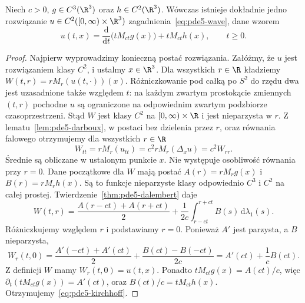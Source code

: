\begin{twierdzenie}
\label{thm:pde5-kirchhoff}
Niech $c>0$, $g\in C^3(\R^3)$ oraz
$h\in C^2(\R^3)$. Wówczas istnieje dokładnie
jedno rozwiązanie $u\in C^2([0,\infty)\times\R^3)$
zagadnienia~\eqref{eq:pde5-wave}, dane wzorem
\begin{equation}\label{eq:pde5-kirchhoff}
 u(t,x)=\frac{\mathrm d}{\mathrm dt}
 \bigl(t M_{ct}g(x)\bigr)+t M_{ct}h(x),\qquad t\geq0.
\end{equation}
\end{twierdzenie}
\begin{proof}
Najpierw wyprowadzimy konieczną postać rozwiązania.
Załóżmy, że $u$ jest rozwiązaniem klasy $C^2$,
i ustalmy $x\in\R^3$. Dla wszystkich $r\in\R$
kładziemy $W(t,r)=rM_r(u(t,\cdot))(x)$.
Różniczkowanie pod całką po $S^2$ do rzędu dwa
jest uzasadnione także względem $t$: na każdym
zwartym prostokącie zmiennych $(t,r)$ pochodne
$u$ są ograniczone na odpowiednim zwartym
podzbiorze czasoprzestrzeni. Stąd $W$ jest klasy
$C^2$ na $[0,\infty)\times\R$ i jest nieparzysta
w $r$. Z lematu~\ref{lem:pde5-darboux}, w postaci
bez dzielenia przez $r$, oraz równania falowego
otrzymujemy dla wszystkich $r\in\R$
\[
 W_{tt}=rM_r(u_{tt})=c^2rM_r(\Delta_xu)=c^2W_{rr}.
\]
Średnie są obliczane w ustalonym punkcie $x$.
Nie występuje osobliwość równania przy $r=0$.
Dane początkowe dla $W$ mają postać
$A(r)=rM_rg(x)$ i $B(r)=rM_rh(x)$.
Są to funkcje nieparzyste klasy odpowiednio
$C^3$ i $C^2$ na całej prostej.
Twierdzenie~\ref{thm:pde5-dalembert} daje
\[
 W(t,r)=\frac{A(r-ct)+A(r+ct)}2+
 \frac1{2c}\int_{r-ct}^{r+ct}B(s)\,\mathrm d\lambda_1(s).
\]
Różniczkujemy względem $r$ i podstawiamy $r=0$.
Ponieważ $A'$ jest parzysta, a $B$ nieparzysta,
\[
 W_r(t,0)=\frac{A'(-ct)+A'(ct)}2
 +\frac{B(ct)-B(-ct)}{2c}
 =A'(ct)+\frac1c B(ct).
\]
Z definicji $W$ mamy $W_r(t,0)=u(t,x)$.
Ponadto $tM_{ct}g(x)=A(ct)/c$, więc
$\partial_t(tM_{ct}g(x))=A'(ct)$,
oraz $B(ct)/c=tM_{ct}h(x)$.
Otrzymujemy~\eqref{eq:pde5-kirchhoff}.


\end{proof}
